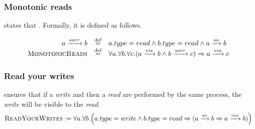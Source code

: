 \subsubsection{Monotonic reads} states that \cite{ViottiVukolic}. Formally, it is defined as follows.

$$
\begin{array}{rcl}
    a\xrightarrow{sorr} b & \stackrel{\text{def}}{=} & 
 a.type=read\land b.type=read \wedge a\xrightarrow{so} b \\
 \textsc{MonotonicReads} & \stackrel{\text{def}}{=} & 
 \forall a. \forall b.\forall c.  
(a\xrightarrow{vis}b\land b\xrightarrow{sorr} c)\Rightarrow a\xrightarrow{vis}c
\end{array}
$$

\subsubsection{Read your writes} ensures that if a \textsl{write} and then a \textsl{read} are performed by the same process, the \textsl{write} will be visible to the \textsl{read}.
\begin{gather*}
\textsc{ReadYourWrites} := \forall	a.\forall b.\Big( a.type=write\land b.type=read\Rightarrow ( a\xrightarrow{so}b \Rightarrow a\xrightarrow{vis}b  ) \Big)
\end{gather*}




